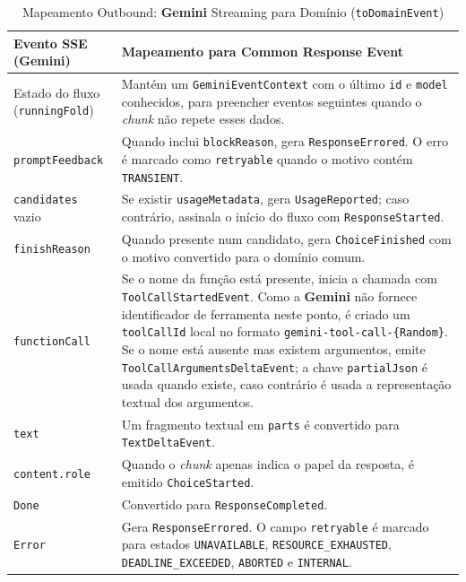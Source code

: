     \begin{table}[H]
        \centering
        \footnotesize
        \renewcommand{\arraystretch}{1.25}
        \begin{tabularx}{\textwidth}{|>{\raggedright\arraybackslash}p{4cm}|Y|}
            \hline
            \textbf{Evento SSE (Gemini)} & \textbf{Mapeamento para Common Response Event} \\
            \hline
            Estado do fluxo (\texttt{runningFold}) & Mantém um \texttt{GeminiEventContext} com o último \texttt{id} e \texttt{model} conhecidos, para preencher eventos seguintes quando o \textit{chunk} não repete esses dados. \\
            \hline
            \texttt{promptFeedback} & Quando inclui \texttt{blockReason}, gera \texttt{ResponseErrored}. O erro é marcado como \texttt{retryable} quando o motivo contém \texttt{TRANSIENT}. \\
            \hline
            \texttt{candidates} vazio & Se existir \texttt{usageMetadata}, gera \texttt{UsageReported}; caso contrário, assinala o início do fluxo com \texttt{ResponseStarted}. \\
            \hline
            \texttt{finishReason} & Quando presente num candidato, gera \texttt{ChoiceFinished} com o motivo convertido para o domínio comum. \\
            \hline
            \texttt{functionCall} & Se o nome da função está presente, inicia a chamada com \texttt{ToolCallStartedEvent}. Como a \textbf{Gemini} não fornece identificador de ferramenta neste ponto, é criado um \texttt{toolCallId} local no formato \texttt{gemini-tool-call-\{Random\}}. Se o nome está ausente mas existem argumentos, emite \texttt{ToolCallArgumentsDeltaEvent}; a chave \texttt{partialJson} é usada quando existe, caso contrário é usada a representação textual dos argumentos. \\
            \hline
            \texttt{text} & Um fragmento textual em \texttt{parts} é convertido para \texttt{TextDeltaEvent}. \\
            \hline
            \texttt{content.role} & Quando o \textit{chunk} apenas indica o papel da resposta, é emitido \texttt{ChoiceStarted}. \\
            \hline
            \texttt{Done} & Convertido para \texttt{ResponseCompleted}. \\
            \hline
            \texttt{Error} & Gera \texttt{ResponseErrored}. O campo \texttt{retryable} é marcado para estados \texttt{UNAVAILABLE}, \texttt{RESOURCE\_EXHAUSTED}, \texttt{DEADLINE\_EXCEEDED}, \texttt{ABORTED} e \texttt{INTERNAL}. \\
            \hline
        \end{tabularx}
        \caption{Mapeamento Outbound: \textbf{Gemini} Streaming para Domínio (\texttt{toDomainEvent})}
    \end{table}

